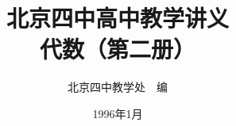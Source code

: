 \documentclass[b5paper, openany]{ctexbook}
\theoremstyle{plain}
\begin{document}
\title{\Huge\bfseries 北京四中高中教学讲义\\代数（第二册）}



\author{\Large 北京四中教学处~~编}
\date{\Large 1996年1月}

\maketitle




\frontmatter


\tableofcontents


\mainmatter












\backmatter
\end{document}
